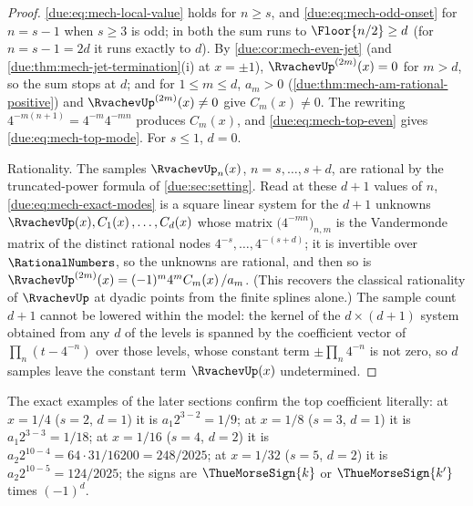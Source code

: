 \documentclass[11pt,oneside]{article}
\theoremstyle{plain}
\theoremstyle{definition}
\theoremstyle{remark}
\newcommand{\upn}[1]{\RvachevUp_{#1}}
\newcommand{\am}[1]{a_{#1}}                                 %
\newcommand{\Cr}[2]{C_{#1}\!\left(#2\right)}                %
\begin{document}
\begin{proof}
\cref{due:eq:mech-local-value} holds for \(n\ge s\), and
\cref{due:eq:mech-odd-onset} for \(n=s-1\) when \(s\ge3\) is odd; in both the
sum runs to \(\Floor{n/2}\ge d\) (for \(n=s-1=2d\) it runs exactly to \(d\)).
By \cref{due:cor:mech-even-jet} (and \cref{due:thm:mech-jet-termination}(i)
at \(x=\pm1\)), \(\RvachevUp^{(2m)}(x)=0\) for \(m>d\), so
the sum stops at \(d\); and for \(1\le m\le d\), \(\am{m}>0\)
(\cref{due:thm:mech-am-rational-positive}) and \(\RvachevUp^{(2m)}(x)\ne0\)
give \(\Cr{m}{x}\ne0\).  The rewriting
\(4^{-m(n+1)}=4^{-m}4^{-mn}\) produces \(\Cr{m}{x}\), and
\cref{due:eq:mech-top-even} gives \cref{due:eq:mech-top-mode}.  For \(s\le1\),
\(d=0\).

Rationality.  The samples \(\upn{n}(x)\), \(n=s,\ldots,s+d\), are rational by
the truncated-power formula of \cref{due:sec:setting}.  Read at these
\(d+1\) values of \(n\), \cref{due:eq:mech-exact-modes} is a square linear
system for the \(d+1\) unknowns \(\RvachevUp(x),\Cr{1}{x},\ldots,\Cr{d}{x}\)
whose matrix \(\bigl(4^{-mn}\bigr)_{n,m}\) is the Vandermonde matrix of the
distinct rational nodes \(4^{-s},\ldots,4^{-(s+d)}\); it is invertible over
\(\RationalNumbers\), so the unknowns are rational, and then so is
\(\RvachevUp^{(2m)}(x)=(-1)^{m}4^{m}\Cr{m}{x}/\am{m}\).  (This recovers the
classical rationality of \(\RvachevUp\) at dyadic points from the finite
splines alone.)  The sample count \(d+1\) cannot be lowered within the model:
the kernel of the \(d\times(d+1)\) system obtained from any \(d\) of the
levels is spanned by the coefficient vector of
\(\prod_{n}(t-4^{-n})\) over those levels, whose constant term
\(\pm\prod_n4^{-n}\) is not zero, so \(d\) samples leave the constant term
\(\RvachevUp(x)\) undetermined.
\end{proof}

The exact examples of the later sections confirm the top coefficient
literally: at \(x=1/4\) (\(s=2\), \(d=1\)) it is
\(\am{1}2^{3-2}=1/9\); at \(x=1/8\) (\(s=3\), \(d=1\)) it is
\(\am{1}2^{3-3}=1/18\); at \(x=1/16\) (\(s=4\), \(d=2\)) it is
\(\am{2}2^{10-4}=64\cdot31/16200=248/2025\); at \(x=1/32\) (\(s=5\),
\(d=2\)) it is \(\am{2}2^{10-5}=124/2025\); the signs are
\(\ThueMorseSign{k}\) or \(\ThueMorseSign{k'}\) times \((-1)^{d}\).
\end{document}
